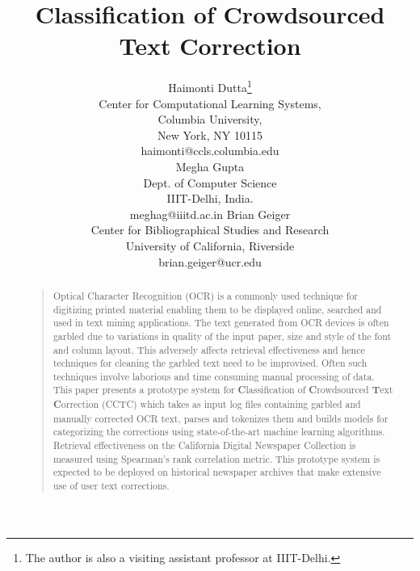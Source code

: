 \documentclass[letterpaper]{article}
\begin{document}
%
\title{ \textbf{C}lassification of \textbf{C}rowdsourced \textbf{T}ext \textbf{C}orrection}

\author{Haimonti Dutta\thanks{The author is also a visiting assistant professor at IIIT-Delhi.}\\
Center for Computational Learning Systems, \\
Columbia University, \\
New York, NY 10115\\
haimonti@ccls.columbia.edu\\
\And
Megha Gupta \\
Dept. of Computer Science\\ 
IIIT-Delhi, India. \\
meghag@iiitd.ac.in
\And 
Brian Geiger \\
Center for Bibliographical Studies and Research \\
University of California, Riverside \\
brian.geiger@ucr.edu
}

\maketitle
\begin{abstract}
\begin{quote}
\noindent Optical Character Recognition (OCR) is a commonly used technique for digitizing printed material enabling them to be displayed online, searched and used in text mining applications. 
The text generated from OCR devices is often garbled due to variations in quality of the input paper, size and style of the font and column layout. This adversely affects retrieval effectiveness and hence techniques for cleaning the garbled text need to be improvised. Often such techniques involve laborious and time consuming manual processing of data. This paper presents a prototype system for \textbf{C}lassification of \textbf{C}rowdsourced \textbf{T}ext \textbf{C}orrection (CCTC) which takes as input log files containing garbled and manually corrected OCR text, parses and tokenizes them and builds models for categorizing the corrections using state-of-the-art machine learning algorithms. Retrieval effectiveness on the California Digital Newspaper Collection is measured using Spearman's rank correlation metric. This prototype system is expected to be deployed on historical newspaper archives that make extensive use of user text corrections.
\end{quote}
\end{abstract}
\end{document}
